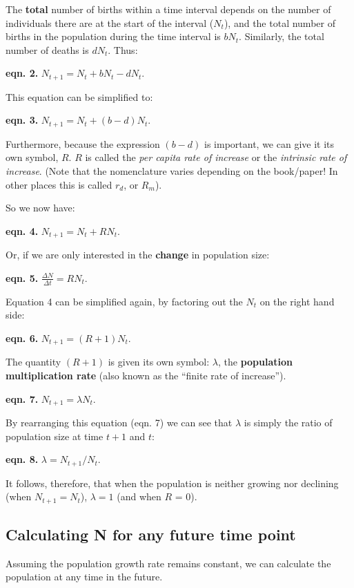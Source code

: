 \documentclass[
  a4paper]{book}
\begin{document}
The \textbf{total} number of births within a time interval depends on the number of individuals there are at the start of the interval (\(N_t\)), and the total number of births in the population during the time interval is \(bN_t\). Similarly, the total number of deaths is \(dN_t\). Thus:

\textbf{eqn. 2.} \(N_{t+1} = N_t + bN_t - dN_t\).

This equation can be simplified to:

\textbf{eqn. 3.} \(N_{t+1} = N_t + (b-d)N_t\).

Furthermore, because the expression \((b-d)\) is important, we can give it its own symbol, \(R\). \(R\) is called the \emph{per capita rate of increase} or the \emph{intrinsic rate of increase}. (Note that the nomenclature varies depending on the book/paper! In other places this is called \(r_d\), or \(R_m\)).

So we now have:

\textbf{eqn. 4.} \(N_{t+1} = N_t + RN_t\).

Or, if we are only interested in the \textbf{change} in population size:

\textbf{eqn. 5.} \(\frac{\Delta N}{\Delta t} = RN_t\).

Equation 4 can be simplified again, by factoring out the \(N_t\) on the right hand side:

\textbf{eqn. 6.} \(N_{t+1} = (R + 1)N_t\).

The quantity \((R+1)\) is given its own symbol: \(\lambda\), the \textbf{population multiplication rate} (also known as the ``finite rate of increase'').

\textbf{eqn. 7.} \(N_{t+1} = \lambda N_t\).

By rearranging this equation (eqn. 7) we can see that \(\lambda\) is simply the ratio of population size at time \(t+1\) and \(t\):

\textbf{eqn. 8.} \(\lambda = N_{t+1}/N_t\).

It follows, therefore, that when the population is neither growing nor declining (when \(N_{t+1}=N_t\)), \(\lambda = 1\) (and when \(R\) = 0).

\hypertarget{calculating-n-for-any-future-time-point}{%
\subsection{Calculating N for any future time point}\label{calculating-n-for-any-future-time-point}}

Assuming the population growth rate remains constant, we can calculate the population at any time in the future.
\end{document}
